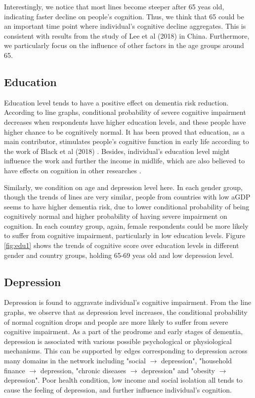 \documentclass[11pt,twoside]{article}
\numberwithin{Theorem}{section}
\numberwithin{Definition}{section}
\numberwithin{Lemma}{section}
\numberwithin{Algorithm}{section}
\numberwithin{equation}{section}
\begin{document}
Interestingly, we notice that most lines become steeper after 65 yeas old, indicating faster decline on people's cognition. Thus, we think that 65 could be an important time point where individual's cognitive decline aggregates. This is consistent with results from the study of Lee et al (2018) \cite{lee2018association} in China. Furthermore, we particularly focus on the influence of other factors in the age groups around 65.

\subsection {Education}

Education level tends to have a positive effect on dementia risk reduction. According to line graphs, conditional probability of severe cognitive impairment decreases when respondents have higher education levels, and these people have higher chance to be cognitively normal. It has been proved that education, as a main contributor, stimulates people's cognitive function in early life according to the work of Black et al (2018) \cite{blacker2018brain}. Besides, individual's education level might influence the work and further the income in midlife, which are also believed to have effects on cognition in other researches \cite{livingston2017dementia}.

Similarly, we condition on age and depression level here. In each gender group, though the trends of lines are very similar, people from countries with low aGDP seems to have higher dementia risk, due to lower conditional probability of being cognitively normal and higher probability of having severe impairment on cognition. In each country group, again, female respondents could be more likely to suffer from cognitive impairment, particularly in low education levels. Figure \ref{fig:edu1} shows the trends of cognitive score over education levels in different gender and country groups, holding 65-69 yeas old and low depression level.

\subsection{Depression}

Depression is found to aggravate individual's cognitive impairment. From the line graphs, we observe that as depression level increases, the conditional probability of normal cognition drops and people are more likely to suffer from severe cognitive impairment. As a part of the prodrome and early stages of dementia, depression is associated with various possible psychological or physiological mechanisms. This can be supported by edges corresponding to depression across many domains in the network including "social $\rightarrow$ depression", "household finance $\rightarrow$ depression, "chronic diseases $\rightarrow$ depression" and "obesity $\rightarrow$ depression".  Poor health condition, low income and social isolation all tends to cause the feeling of depression, and further influence individual's cognition.
\end{document}
